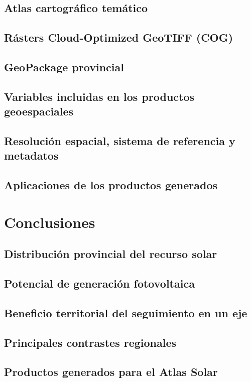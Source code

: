 \documentclass[11pt,a4paper]{article}
\begin{document}
\subsection{Atlas cartográfico temático}
\subsection{Rásters Cloud-Optimized GeoTIFF (COG)}
\subsection{GeoPackage provincial}
\subsection{Variables incluidas en los productos geoespaciales}
\subsection{Resolución espacial, sistema de referencia y metadatos}
\subsection{Aplicaciones de los productos generados}



\section{Conclusiones}

\subsection{Distribución provincial del recurso solar}
\subsection{Potencial de generación fotovoltaica}
\subsection{Beneficio territorial del seguimiento en un eje}
\subsection{Principales contrastes regionales}
\subsection{Productos generados para el Atlas Solar}
\end{document}
